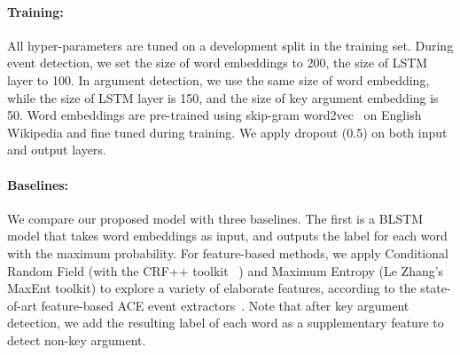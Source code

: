 \paragraph{Training:} All hyper-parameters are tuned on a development split in the training set. During event detection, we set the size of word embeddings to 200, the size of LSTM layer to 100. In argument detection, we use the same size of word embedding, while the size of LSTM layer is 150, and the size of key argument embedding is 50. Word embeddings are pre-trained using skip-gram word2vec~\cite{mikolov2013distributed} on English Wikipedia and fine tuned during training. We apply dropout (0.5) on both input and output layers.




\paragraph{Baselines:}
We compare our proposed model with three baselines. %
The first is a  BLSTM model that takes word embeddings as input, and outputs the label for each word with the maximum probability. %
For feature-based methods, we apply Conditional Random Field (with the CRF++ toolkit~\cite{kudo2005crf++} ) and Maximum Entropy \cite{berger1996maximum} (Le Zhang's MaxEnt toolkit) to explore a variety of elaborate features,
according to the state-of-art feature-based ACE event extractors~\cite{li2013joint}.
%
Note that after key argument detection, we add the resulting label of each word as a supplementary feature to detect non-key argument.


